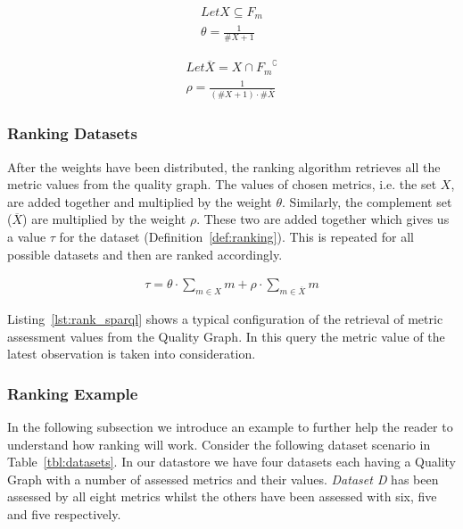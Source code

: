 \begin{Def1}
\label{def:weight_adjustment}
\begin{align*}
\mathit{Let} X \subseteq F_{m} \\
\theta = \frac{1}{\#X + 1}
\end{align*}
\end{Def1}

\begin{Def1}
\label{def:weight_adjustment_smaller}
\begin{align*}
\mathit{Let} \overline{X} = X \cap {F_{m}}^{\complement} \\
\rho = \frac{1}{(\#X + 1) \cdot \#\overline{X}}
\end{align*}
\end{Def1}

\subsubsection{Ranking Datasets}
After the weights have been distributed, the ranking algorithm retrieves all the metric values from the quality graph.
The values of chosen metrics, i.e. the set $X$, are added together and multiplied by the weight $\theta$.
Similarly, the complement set ($\overline{X}$) are multiplied by the weight $\rho$.
These two are added together which gives us a value $\tau$ for the dataset (Definition~\ref{def:ranking}).
This is repeated for all possible datasets and then are ranked accordingly.
\begin{Def1}
\label{def:ranking}
\begin{align*}
\tau = \theta \cdot \sum_{m\in X} m + \rho \cdot \sum_{m\in\overline{X}} m
\end{align*}
\end{Def1}

Listing~\ref{lst:rank_sparql} shows a typical configuration of the retrieval of metric assessment values from the Quality Graph.
In this query the metric value of the latest observation is taken into consideration.


\subsubsection{Ranking Example}
In the following subsection we introduce an example to further help the reader to understand how ranking will work.
Consider the following dataset scenario in Table~\ref{tbl:datasets}.
In our datastore we have four datasets each having a Quality Graph with a number of assessed metrics and their values.
\textit{Dataset D} has been assessed by all eight metrics whilst the others have been assessed with six, five and five respectively.

